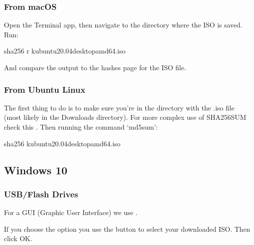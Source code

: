 \documentclass[letterpaper,10pt,english]{sphinxmanual}
\begin{document}
\subsubsection{From macOS}
\label{\detokenize{docs/installation:from-macos}}
\sphinxAtStartPar
Open the Terminal app, then navigate to the directory where the ISO is saved.
Run:

\begin{sphinxVerbatim}[commandchars=\\\{\}]
sha256 \PYGZhy{}r kubuntu\PYGZhy{}20.04\PYGZhy{}desktop\PYGZhy{}amd64.iso
\end{sphinxVerbatim}

\sphinxAtStartPar
And compare the output to the hashes page for the ISO file.


\subsubsection{From Ubuntu Linux}
\label{\detokenize{docs/installation:from-ubuntu-linux}}
\sphinxAtStartPar
The first thing to do is to make sure you’re in the directory with the .iso file (most likely in the Downloads directory). For more complex use of SHA256SUM check this . Then running the command ‘md5sum’:

\begin{sphinxVerbatim}[commandchars=\\\{\}]
sha256 kubuntu\PYGZhy{}20.04\PYGZhy{}desktop\PYGZhy{}amd64.iso
\end{sphinxVerbatim}


\subsection{Windows 10}
\label{\detokenize{docs/installation:windows-10}}

\subsubsection{USB/Flash Drives}
\label{\detokenize{docs/installation:usb-flash-drives}}\label{\detokenize{docs/installation:usb-drives-link}}
\sphinxAtStartPar
For a GUI (Graphic User Interface) we use .

\sphinxAtStartPar
If you choose the  option you use the  button to select your downloaded ISO. Then click OK.
\end{document}
